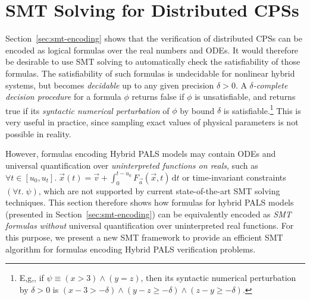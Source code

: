 

\section{SMT Solving for Distributed CPSs}
\label{sec:smt-logic}

Section~\ref{sec:smt-encoding} shows that  the verification of
distributed CPSs 
can be encoded as logical formulas over the real numbers and ODEs. 
It would therefore be desirable to use SMT solving to automatically
check the satisfiability of those formulas. 
%
The satisfiability of such  formulas is undecidable for nonlinear hybrid systems,
but becomes \emph{decidable} up to any given precision $\delta > 0$. 
%
A \emph{$\delta$-complete decision procedure} for a formula $\phi$ returns false 
if $\phi$ is unsatisfiable, and returns true if its \emph{syntactic numerical perturbation} of $\phi$ by bound $\delta$ is
satisfiable.\footnote{E,g,, if $\psi \equiv (x > 3) \wedge (y = z)$, then 
its syntactic numerical perturbation by $\delta> 0$
is $(x - 3 > -\delta) \wedge (y - z \geq -\delta) \wedge (z - y \geq -\delta)$.} 
This is  very useful in practice, since 
sampling exact values of physical parameters is not possible in reality. 

However, formulas encoding Hybrid PALS models
may contain ODEs and universal quantification over \emph{uninterpreted
  functions on reals},
such as 
$\forall t \in [u_0,u_t].\;
\vec{x}(t) = \vec{v} + \int_0^{t-u_0} \!  F_{\vec{a}}(\vec{x},t)\,\mathrm{d}t$
or time-invariant constraints $(\forall t.\; \psi)$,
which are not supported by current state-of-the-art SMT solving techniques.
%
%
This section therefore shows how formulas for hybrid PALS models (presented in Section~\ref{sec:smt-encoding})
can be equivalently encoded as \emph{SMT formulas}
\emph{without}  universal quantification over uninterpreted real functions.
For this purpose, we present a new  SMT framework to provide 
an efficient SMT algorithm
for  formulas encoding Hybrid PALS verification problems.


